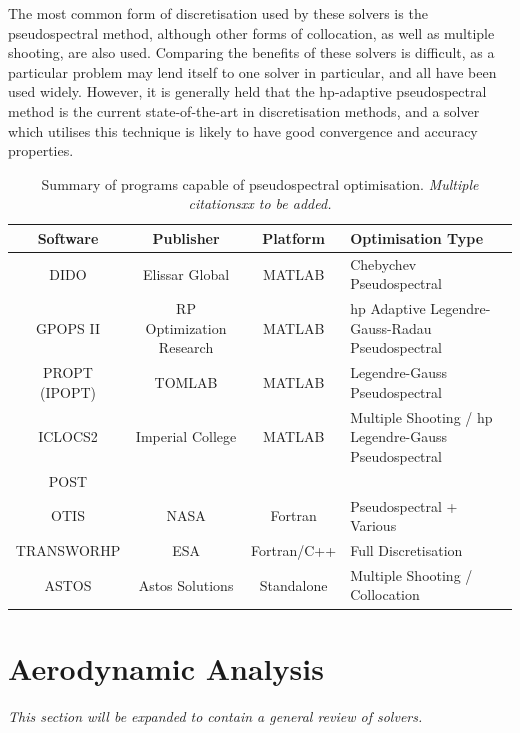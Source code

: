  The most common form of discretisation used by these solvers is the pseudospectral method, although other forms of collocation, as well as multiple shooting, are also used. Comparing the benefits of these solvers is difficult, as a particular problem may lend itself to one solver in particular, and all have been used widely. However, it is generally held that the hp-adaptive pseudospectral method is the current state-of-the-art in discretisation methods, and a solver which utilises this technique is likely to have good convergence and accuracy properties. 

\begin{table}[!ht]
	
	\begin{tabular}{|c|c|c| p{7cm}|}
		\hline \textbf{Software} & \textbf{Publisher} & \textbf{Platform} & \textbf{Optimisation Type} \\ 
		\hline DIDO\cite{Ross2002} & Elissar Global & MATLAB & Chebychev Pseudospectral \\ 
		\hline GPOPS II\cite{Rao2010} & RP Optimization Research & MATLAB & hp Adaptive Legendre-Gauss-Radau Pseudospectral \\ 
		\hline PROPT (IPOPT) & TOMLAB & MATLAB & Legendre-Gauss  Pseudospectral  \\ 
		\hline ICLOCS2 & Imperial College & MATLAB &  Multiple Shooting / hp Legendre-Gauss Pseudospectral  \\ 
		\hline POST &  &  &  \\ 
		\hline OTIS & NASA  & Fortran & Pseudospectral + Various  \\ 
		\hline TRANSWORHP\cite{Wassel2013} & ESA & Fortran/C++ & Full Discretisation \\ 
		\hline ASTOS & Astos Solutions & Standalone & Multiple Shooting / Collocation  \\  
		
		\hline 
	\end{tabular} 
	
	\caption{Summary of programs capable of pseudospectral optimisation. \textit{Multiple citationsxx to be added.}}
	\label{table:programs}
\end{table}



\section{Aerodynamic Analysis}

\textit{This section will be expanded to contain a general review of solvers.}

